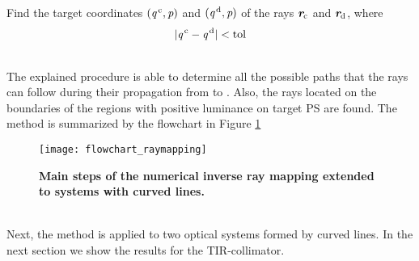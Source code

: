 \begin{algorithm}
\begin{algorithmic}[1]
\State Find the target coordinates $(\textit{q}^{\,\textrm{c}},\textit{p})$ and $(\textit{q}^{\,\textrm{d}},\textit{p})$ of the rays $\textit{\textbf{r}}_{\textrm{c}}$ and $\textit{\textbf{r}}_{\textrm{d}}$, where $$|\textit{q}^{\,\textrm{c}}-\textit{q}^{\,\textrm{d}}|<\textrm{tol}$$
\If {$\lineaj\neq \nline$}
\State{}
\EndIf 
\State{}
\EndIf
\EndProcedure
\end{algorithmic}
\end{algorithm}
\\ \indent The explained procedure is able to determine all the possible paths that the rays can follow during their propagation from  to . Also, the rays located on the boundaries of the regions with positive luminance on target PS  are found.
The method is summarized by the flowchart in Figure \ref{fig:flowchart_raymapping}
\begin{figure}[t]
  \begin{center}
  \texttt{[image: flowchart\_raymapping]}
  \end{center}
  \caption{\textbf{Main steps of the numerical inverse ray mapping extended to systems with curved lines.}}
\label{fig:flowchart_raymapping}
 \end{figure}
\\ \indent
Next, the method is applied to two optical systems formed by curved lines. In the next section we show the results for the TIR-collimator.
